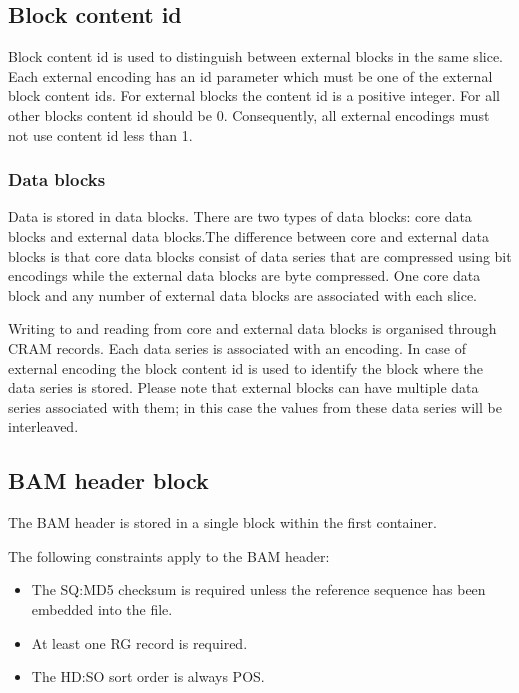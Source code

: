 \documentclass[a4paper]{article}
\begin{document}
\subsection{\textbf{Block content id}}

Block content id is used to distinguish between external blocks in the same slice. 
Each external encoding has an id parameter which must be one of the external block 
content ids. For external blocks the content id is a positive integer. For all 
other blocks content id should be 0. Consequently, all external encodings must 
not use content id less than 1. 

\subsubsection*{Data blocks}

Data is stored in data blocks. There are two types of data blocks: core data blocks 
and external data blocks.The difference between core and external data blocks is 
that core data blocks consist of data series that are compressed using bit encodings 
while the external data blocks are byte compressed. One core data block and any 
number of external data blocks are associated with each slice.

Writing to and reading from core and external data blocks is organised through 
CRAM records. Each data series is associated with an encoding. In case of external 
encoding the block content id is used to identify the block where the data series 
is stored. Please note that external blocks can have multiple data series associated 
with them; in this case the values from these data series will be interleaved. 


\subsection{\textbf{BAM header block}}

The BAM header is stored in a single block within the first container. 

The following constraints apply to the BAM header: 

\begin{itemize}
\item The SQ:MD5 checksum is required unless the reference sequence has been embedded 
into the file.

\item At least one RG record is required.

\item The HD:SO sort order is always POS.
\end{itemize}
\end{document}
